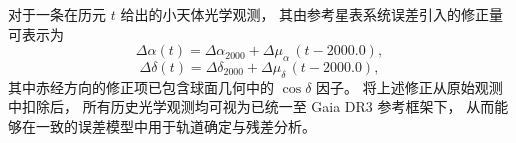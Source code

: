 对于一条在历元 $t$ 给出的小天体光学观测，
其由参考星表系统误差引入的修正量可表示为
\begin{equation}
\Delta\alpha(t) = \Delta\alpha_{2000} + \Delta\mu_{\alpha}\,(t - 2000.0),
\end{equation}
\begin{equation}
\Delta\delta(t) = \Delta\delta_{2000} + \Delta\mu_{\delta}\,(t - 2000.0),
\end{equation}
其中赤经方向的修正项已包含球面几何中的 $\cos\delta$ 因子。
将上述修正从原始观测中扣除后，
所有历史光学观测均可视为已统一至 Gaia DR3 参考框架下，
从而能够在一致的误差模型中用于轨道确定与残差分析。

\newpage